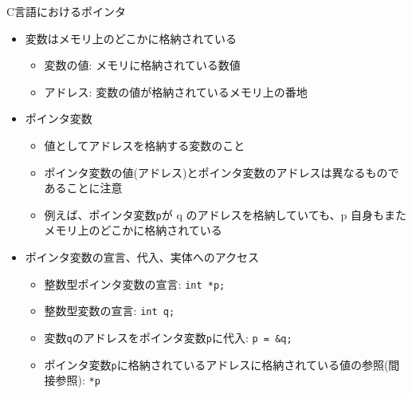 \begin{frame}[t,fragile]{C言語におけるポインタ}
  \begin{itemize}
  \item 変数はメモリ上のどこかに格納されている
    \begin{itemize}
    \item 変数の値: メモリに格納されている数値
    \item アドレス: 変数の値が格納されているメモリ上の番地
    \end{itemize}
  \item ポインタ変数
    \begin{itemize}
    \item 値としてアドレスを格納する変数のこと
    \item ポインタ変数の値(アドレス)とポインタ変数のアドレスは異なるものであることに注意
    \item 例えば、ポインタ変数\verb+p+が q のアドレスを格納していても、p 自身もまたメモリ上のどこかに格納されている
    \end{itemize}
  \item ポインタ変数の宣言、代入、実体へのアクセス
    \begin{itemize}
    \item 整数型ポインタ変数の宣言: {\color{red} \verb+int *p;+}
    \item 整数型変数の宣言: \verb+int q;+
    \item 変数\verb+q+のアドレスをポインタ変数\verb+p+に代入: {\color{red} \verb+p = &q;+}
    \item ポインタ変数\verb+p+に格納されているアドレスに格納されている値の参照(間接参照): {\color{red} \verb+*p+}
    \end{itemize}
  \end{itemize}
\end{frame}
